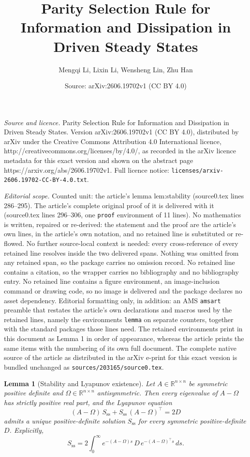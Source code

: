 \documentclass[10pt,a4paper]{amsart}
\title{Parity Selection Rule for Information and Dissipation in Driven Steady States}
\author{Mengqi Li, Lixin Li, Wensheng Lin, Zhu Han}
\date{Source: arXiv:2606.19702v1 (CC BY 4.0)}
\newtheorem{lemma}{Lemma}
\newcommand{\RR}{\mathbb{R}}
\newcommand{\Sss}{S_{\mathrm{ss}}}
\begin{document}
\maketitle

\noindent\emph{Source and licence.} Parity Selection Rule for Information and Dissipation in Driven Steady States. Version arXiv:2606.19702v1 (CC BY 4.0), distributed by arXiv under the Creative Commons Attribution 4.0 International licence, http://creativecommons.org/licenses/by/4.0/, as recorded in the arXiv licence metadata for this exact version and shown on the abstract page https://arxiv.org/abs/2606.19702v1. Full licence notice: \texttt{licenses/arxiv-2606.19702-CC-BY-4.0.txt}.\par\smallskip

\noindent\textit{Editorial scope.} Counted unit: the article's lemma lem:stability (source0.tex lines 286--295). The article's complete original proof of it is delivered with it (source0.tex lines 296--306, one \texttt{proof} environment of 11 lines). No mathematics is written, repaired or re-derived: the statement and the proof are the article's own lines, in the article's own notation, and no retained line is substituted or re-flowed.  No further source-local context is needed: every cross-reference of every retained line resolves inside the two delivered spans.  Nothing was omitted from any retained span, so the package carries no omission record.  No retained line contains a citation, so the wrapper carries no bibliography and no bibliography entry.  No retained line contains a figure environment, an image-inclusion command or drawing code, so no image is delivered and the package declares no asset dependency.  Editorial formatting only, in addition: an AMS \texttt{amsart} preamble that restates the article's own declarations and macros used by the retained lines, namely the environments \texttt{lemma} on separate counters, together with the standard packages those lines need.  The retained environments print in this document as Lemma 1 in order of appearance, whereas the article prints the same items with the numbering of its own full document.  The complete native source of the article as distributed in the arXiv e-print for this exact version is bundled unchanged as \texttt{sources/203165/source0.tex}.
\begin{lemma}[Stability and Lyapunov existence]\label{lem:stability}
Let $A \in \RR^{n \times n}$ be symmetric positive definite and $\Omega \in \RR^{n \times n}$ antisymmetric. Then every eigenvalue of $A - \Omega$ has strictly positive real part, and the Lyapunov equation
\begin{equation}\label{eq:S-lyap-general}
(A - \Omega)\,\Sss + \Sss\,(A - \Omega)^\top = 2 D
\end{equation}
admits a unique positive-definite solution $\Sss$ for every symmetric positive-definite $D$. Explicitly,
\begin{equation}\label{eq:S-lyap-integral}
\Sss = 2 \int_0^\infty e^{-(A - \Omega) s}\, D\, e^{-(A - \Omega)^\top s}\, ds.
\end{equation}
\end{lemma}
\end{document}
